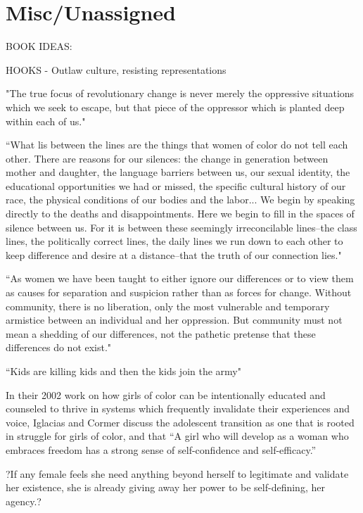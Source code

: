 \documentclass[a4paper, 11pt]{article} %
\begin{document}


\section*{Misc/Unassigned}

BOOK IDEAS:

HOOKS - Outlaw culture, resisting representations

"The true focus of revolutionary change is never merely the oppressive situations which we seek to escape, but that piece of the oppressor which is planted deep within each of us." \cite{lordredefiningdifference} 

``What lis between the lines are the things that women of color do not tell each other. There are reasons for our silences: the change in generation between mother and daughter, the language barriers between us, our sexual identity, the educational opportunities we had or missed, the specific cultural history of our race, the physical conditions of our bodies and the labor... We begin by speaking directly to the deaths and disappointments. Here we begin to fill in the spaces of silence between us. For it is between these seemingly irreconcilable lines--the class lines, the politically correct lines, the daily lines we run down to each other to keep difference and desire at a distance--that the truth of our connection lies." \cite{thebridge}

``As women we have been taught to either ignore our differences or to view them as causes for separation and suspicion rather than as forces for change. Without community, there is no liberation, only the most vulnerable and temporary armistice between an individual and her oppression. But community must not mean a shedding of our differences, not the pathetic pretense that these differences do not exist." \cite{lorde2003master}

``Kids are killing kids and then the kids join the army" \cite{danceordie}

In their 2002 work on how girls of color can be intentionally educated and counseled to thrive in systems which frequently invalidate their experiences and voice, Iglacias and Cormer discuss the adolescent transition as one that is rooted in struggle for girls of color, and that ``A girl who will develop as a woman who embraces freedom has a strong sense of self-confidence and self-efficacy.'' \cite{iglesiascormier}

?If any female feels she need anything beyond herself to legitimate and validate her existence, she is already giving away her power to be self-defining, her agency.? \cite{hooksforeveryone}
\end{document}

